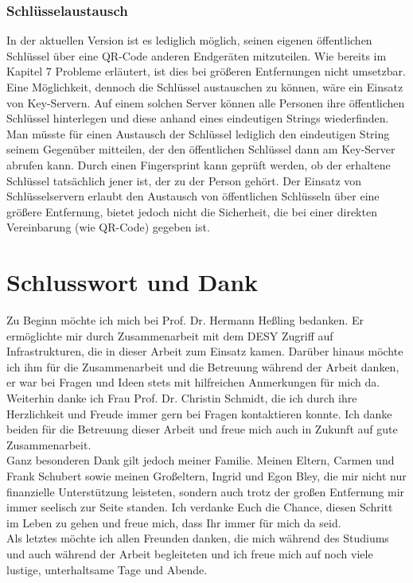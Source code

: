 \documentclass[10pt, a4paper,headsepline,pointednumbers]{scrreprt}
\begin{document}
\subsection{Schlüsselaustausch}
In der aktuellen Version ist es lediglich möglich, seinen eigenen öffentlichen Schlüssel über eine QR-Code anderen Endgeräten mitzuteilen. Wie bereits im Kapitel 7 Probleme erläutert, ist dies bei größeren Entfernungen nicht umsetzbar. Eine Möglichkeit, dennoch die Schlüssel austauschen zu können, wäre ein Einsatz von Key-Servern. Auf einem solchen Server können alle Personen ihre öffentlichen Schlüssel hinterlegen und diese anhand eines eindeutigen Strings wiederfinden. Man müsste für einen Austausch der Schlüssel lediglich den eindeutigen String seinem Gegenüber mitteilen, der den öffentlichen Schlüssel dann am Key-Server abrufen kann. Durch einen Fingersprint kann geprüft werden, ob der erhaltene Schlüssel tatsächlich jener ist, der zu der Person gehört. Der Einsatz von Schlüsselservern erlaubt den Austausch von öffentlichen Schlüsseln über eine größere Entfernung, bietet jedoch nicht die Sicherheit, die bei einer direkten Vereinbarung (wie QR-Code) gegeben ist.

\chapter{Schlusswort und Dank}
Zu Beginn möchte ich mich bei Prof. Dr. Hermann Heßling bedanken. Er ermöglichte mir durch Zusammenarbeit mit dem DESY Zugriff auf Infrastrukturen, die in dieser Arbeit zum Einsatz kamen. Darüber hinaus möchte ich ihm für die Zusammenarbeit und die Betreuung während der Arbeit danken, er war bei Fragen und Ideen stets mit hilfreichen Anmerkungen für mich da. Weiterhin danke ich Frau Prof. Dr. Christin Schmidt, die ich durch ihre Herzlichkeit und Freude immer gern bei Fragen kontaktieren konnte. Ich danke beiden für die Betreuung dieser Arbeit und freue mich auch in Zukunft auf gute Zusammenarbeit. \\
Ganz besonderen Dank gilt jedoch meiner Familie. Meinen Eltern, Carmen und Frank Schubert sowie meinen Großeltern, Ingrid und Egon Bley, die mir nicht nur finanzielle Unterstützung leisteten, sondern auch trotz der großen Entfernung mir immer seelisch zur Seite standen. Ich verdanke Euch die Chance, diesen Schritt im Leben zu gehen und freue mich, dass Ihr immer für mich da seid. \\
Als letztes möchte ich allen Freunden danken, die mich während des Studiums und auch während der Arbeit begleiteten und ich freue mich auf noch viele lustige, unterhaltsame Tage und Abende.
\end{document}
